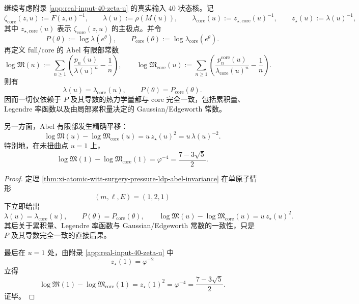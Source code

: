 \begin{theorem}\label{thm:conclusion-realinput40-core-pressure-invariance-abel-shift}
继续考虑附录 \ref{app:real-input-40-zeta-u} 的真实输入 \(40\) 状态核。记
\[
\zeta_{\mathrm{core}}(z,u):=F(z,u)^{-1},
\qquad
\lambda(u):=\rho(M(u)),
\qquad
\lambda_{\mathrm{core}}(u):=z_{\star,\mathrm{core}}(u)^{-1},
\qquad
z_\star(u):=\lambda(u)^{-1},
\]
其中 \(z_{\star,\mathrm{core}}(u)\) 表示 \(\zeta_{\mathrm{core}}(z,u)\) 的主极点。并令
\[
P(\theta):=\log\lambda(e^\theta),
\qquad
P_{\mathrm{core}}(\theta):=\log\lambda_{\mathrm{core}}(e^\theta).
\]
再定义 full/core 的 Abel 有限部常数
\[
\log\mathfrak M(u)
:=
\sum_{n\ge 1}\left(\frac{p_n(u)}{\lambda(u)^n}-\frac1n\right),
\qquad
\log\mathfrak M_{\mathrm{core}}(u)
:=
\sum_{n\ge 1}\left(\frac{p_n^{\mathrm{core}}(u)}{\lambda_{\mathrm{core}}(u)^n}-\frac1n\right).
\]
则有
\[
\boxed{\;
\lambda(u)=\lambda_{\mathrm{core}}(u),
\qquad
P(\theta)=P_{\mathrm{core}}(\theta).\;}
\]
因而一切仅依赖于 \(P\) 及其导数的热力学量都与 core 完全一致，包括累积量、Legendre 率函数以及由局部累积量决定的 Gaussian/Edgeworth 常数。

另一方面，Abel 有限部发生精确平移：
\[
\boxed{\;
\log\mathfrak M(u)-\log\mathfrak M_{\mathrm{core}}(u)
=
u\,z_\star(u)^2
=
u\,\lambda(u)^{-2}.\;}
\]
特别地，在未扭曲点 \(u=1\) 上，
\[
\boxed{\;
\log\mathfrak M(1)-\log\mathfrak M_{\mathrm{core}}(1)
=
\varphi^{-4}
=
\frac{7-3\sqrt5}{2}.\;}
\]
\end{theorem}
\begin{proof}
定理 \ref{thm:xi-atomic-witt-surgery-pressure-ldp-abel-invariance} 在单原子情形
\[
(m,\ell,E)=(1,2,1)
\]
下立即给出
\[
\lambda(u)=\lambda_{\mathrm{core}}(u),
\qquad
P(\theta)=P_{\mathrm{core}}(\theta),
\qquad
\log\mathfrak M(u)-\log\mathfrak M_{\mathrm{core}}(u)=u\,z_\star(u)^2.
\]
其后关于累积量、Legendre 率函数与 Gaussian/Edgeworth 常数的一致性，只是 \(P\) 及其导数完全一致的直接后果。

最后在 \(u=1\) 处，由附录 \ref{app:real-input-40-zeta-u} 中
\[
z_\star(1)=\varphi^{-2}
\]
立得
\[
\log\mathfrak M(1)-\log\mathfrak M_{\mathrm{core}}(1)=z_\star(1)^2=\varphi^{-4}=\frac{7-3\sqrt5}{2}.
\]
证毕。
\end{proof}

